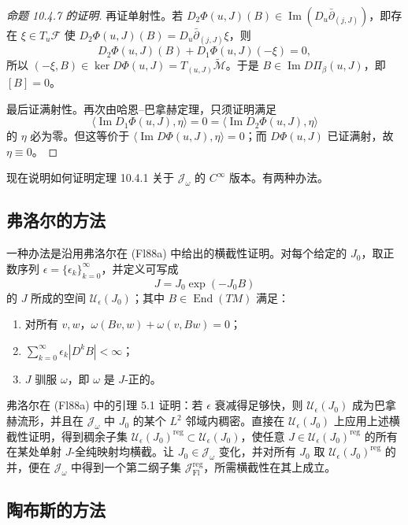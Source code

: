 \begin{proof}[命题 10.4.7 的证明]
再证单射性。若
$D_2\Phi(u,J)(B)\in\operatorname{Im}(D_u\bar\partial_{(j,J)})$，即存在
$\xi\in T_u\mathcal F$ 使
$D_2\Phi(u,J)(B)=D_u\bar\partial_{(j,J)}\xi$，则
\[
 D_2\Phi(u,J)(B)+D_1\Phi(u,J)(-\xi)=0,
\]
所以
$(-\xi,B)\in\ker D\Phi(u,J)=T_{(u,J)}\widetilde{\mathcal M}$。于是
$B\in\operatorname{Im}D\Pi_\beta(u,J)$，即 $[B]=0$。

最后证满射性。再次由哈恩--巴拿赫定理，只须证明满足
\[
 \langle\operatorname{Im}D_1\Phi(u,J),\eta\rangle
 =0=\langle\operatorname{Im}D_2\Phi(u,J),\eta\rangle
\]
的 $\eta$ 必为零。但这等价于
$\langle\operatorname{Im}D\Phi(u,J),\eta\rangle=0$；而
$D\Phi(u,J)$ 已证满射，故 $\eta\equiv0$。
\end{proof}

现在说明如何证明定理 10.4.1 关于 $\mathcal J_\omega$ 的
$C^\infty$ 版本。有两种办法。

\subsection*{弗洛尔的方法}

一种办法是沿用弗洛尔在 (Fl88a) 中给出的横截性证明。对每个给定的
$J_0$，取正数序列 $\epsilon=\{\epsilon_k\}_{k=0}^\infty$，并定义可写成
\[
 J=J_0\exp(-J_0B)
\]
的 $J$ 所成的空间 $\mathcal U_\epsilon(J_0)$；其中
$B\in\operatorname{End}(TM)$ 满足：
\begin{enumerate}[label=(\roman*)]
 \item 对所有 $v,w$，$\omega(Bv,w)+\omega(v,Bw)=0$；
 \item $\sum_{k=0}^\infty\epsilon_k|D^kB|<\infty$；
 \item $J$ 驯服 $\omega$，即 $\omega$ 是 $J$-正的。
\end{enumerate}
弗洛尔在 (Fl88a) 中的引理 5.1 证明：若 $\epsilon$ 衰减得足够快，则
$\mathcal U_\epsilon(J_0)$ 成为巴拿赫流形，并且在
$\mathcal J_\omega$ 中 $J_0$ 的某个 $L^2$ 邻域内稠密。直接在
$\mathcal U_\epsilon(J_0)$ 上应用上述横截性证明，得到稠余子集
$\mathcal U_\epsilon(J_0)^{\mathrm{reg}}\subset\mathcal U_\epsilon(J_0)$，使任意
$J\in\mathcal U_\epsilon(J_0)^{\mathrm{reg}}$ 的所有在某处单射 $J$-全纯映射均横截。让
$J_0\in\mathcal J_\omega$ 变化，并对所有 $J_0$ 取
$\mathcal U_\epsilon(J_0)^{\mathrm{reg}}$ 的并，便在
$\mathcal J_\omega$ 中得到一个第二纲子集
$\mathcal J_{\mathrm{Fl}}^{\mathrm{reg}}$，所需横截性在其上成立。

\subsection*{陶布斯的方法}

